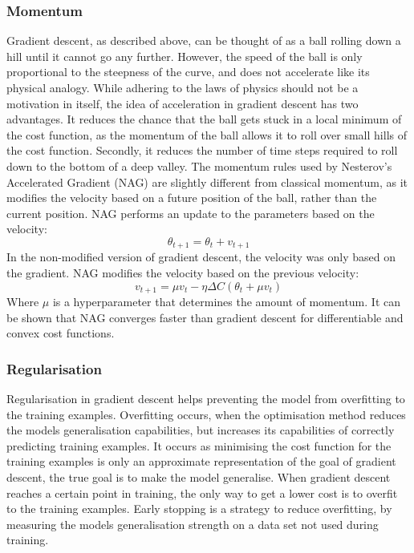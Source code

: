 \subsubsection{Momentum}
Gradient descent, as described above, can be thought of as a ball rolling down a hill until it cannot go any further. However, the speed of the ball is only proportional to the steepness of the curve, and does not accelerate like its physical analogy. While adhering to the laws of physics should not be a motivation in itself, the idea of acceleration in gradient descent has two advantages. It reduces the chance that the ball gets stuck in a local minimum of the cost function, as the momentum of the ball allows it to roll over small hills of the cost function. Secondly, it reduces the number of time steps required to roll down to the bottom of a deep valley. The momentum rules used by Nesterov's Accelerated Gradient (NAG) are slightly different from classical momentum, as it modifies the velocity based on a future position of the ball, rather than the current position. NAG performs an update to the parameters based on the velocity:
$$\theta_{t+1} = \theta_t + v_{t+1}$$
In the non-modified version of gradient descent, the velocity was only based on the gradient. NAG modifies the velocity based on the previous velocity:
$$v_{t+1} = \mu v_t - \eta \Delta C(\theta_t + \mu v_t)$$
Where $\mu$ is a hyperparameter that determines the amount of momentum. It can be shown that NAG converges faster than gradient descent for differentiable and convex cost functions.

\subsubsection{Regularisation}
\label{sec:regularisation}
Regularisation in gradient descent helps preventing the model from overfitting to the training examples. Overfitting occurs, when the optimisation method reduces the models generalisation capabilities, but increases its capabilities of correctly predicting training examples. It occurs as minimising the cost function for the training examples is only an approximate representation of the goal of gradient descent,  the true goal is to make the model generalise. When gradient descent reaches a certain point in training, the only way to get a lower cost is to overfit to the training examples. Early stopping is a strategy to reduce overfitting, by measuring the models generalisation strength on a data set not used during training.

